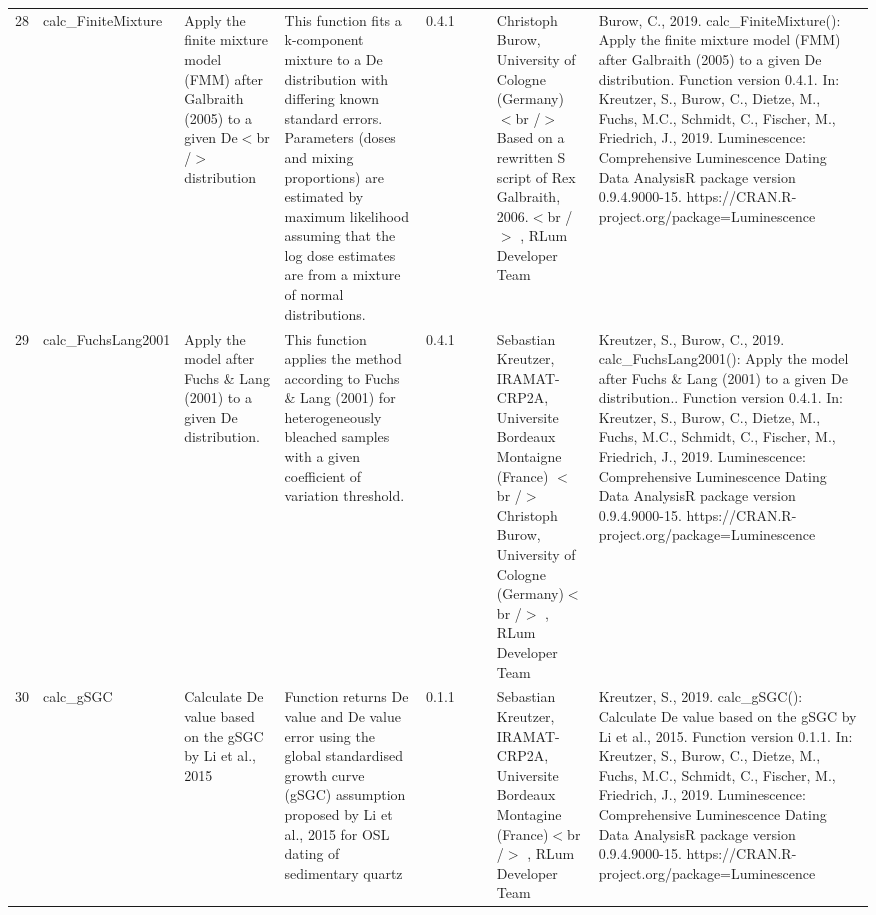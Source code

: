 \begin{table}[ht]
\begin{tabular}{rllllllll}
 \\ 
  28 & calc\_FiniteMixture & Apply the finite mixture model (FMM) after Galbraith (2005) to a given De$<$br /$>$ distribution & This function fits a k-component mixture to a De distribution with differing known standard errors. Parameters (doses and mixing proportions) are estimated by maximum likelihood assuming that the log dose estimates are from a mixture of normal distributions. & 0.4.1
 &  &  & Christoph Burow, University of Cologne (Germany)  $<$br /$>$ Based on a rewritten S script of Rex Galbraith, 2006.$<$br /$>$ , RLum Developer Team & Burow, C., 2019. calc\_FiniteMixture(): Apply the finite mixture model (FMM) after Galbraith (2005) to a given De distribution. Function version 0.4.1. In: Kreutzer, S., Burow, C., Dietze, M., Fuchs, M.C., Schmidt, C., Fischer, M., Friedrich, J., 2019. Luminescence: Comprehensive Luminescence Dating Data AnalysisR package version 0.9.4.9000-15. https://CRAN.R-project.org/package=Luminescence
 \\ 
  29 & calc\_FuchsLang2001 & Apply the model after Fuchs \& Lang (2001) to a given De distribution. & This function applies the method according to Fuchs \& Lang (2001) for heterogeneously bleached samples with a given coefficient of variation threshold. & 0.4.1
 &  &  & Sebastian Kreutzer, IRAMAT-CRP2A, Universite Bordeaux Montaigne (France)  $<$br /$>$ Christoph Burow, University of Cologne (Germany)$<$br /$>$ , RLum Developer Team & Kreutzer, S., Burow, C., 2019. calc\_FuchsLang2001(): Apply the model after Fuchs \& Lang (2001) to a given De distribution.. Function version 0.4.1. In: Kreutzer, S., Burow, C., Dietze, M., Fuchs, M.C., Schmidt, C., Fischer, M., Friedrich, J., 2019. Luminescence: Comprehensive Luminescence Dating Data AnalysisR package version 0.9.4.9000-15. https://CRAN.R-project.org/package=Luminescence
 \\ 
  30 & calc\_gSGC & Calculate De value based on the gSGC by Li et al., 2015 & Function returns De value and De value error using the global standardised growth curve (gSGC) assumption proposed by Li et al., 2015 for OSL dating of sedimentary quartz & 0.1.1
 &  &  & Sebastian Kreutzer, IRAMAT-CRP2A, Universite Bordeaux Montagine (France)$<$br /$>$ , RLum Developer Team & Kreutzer, S., 2019. calc\_gSGC(): Calculate De value based on the gSGC by Li et al., 2015. Function version 0.1.1. In: Kreutzer, S., Burow, C., Dietze, M., Fuchs, M.C., Schmidt, C., Fischer, M., Friedrich, J., 2019. Luminescence: Comprehensive Luminescence Dating Data AnalysisR package version 0.9.4.9000-15. https://CRAN.R-project.org/package=Luminescence

\end{tabular}
\end{table}
